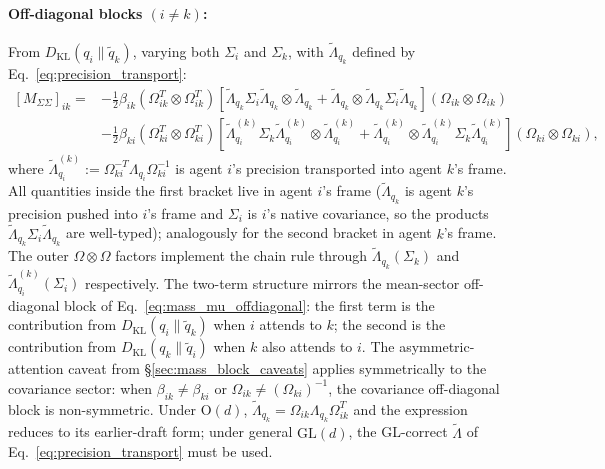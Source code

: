 \documentclass[11pt]{article}
\begin{document}
\paragraph{Off-diagonal blocks $(i \neq k)$:} From $D_{\mathrm{KL}}(q_i \| \tilde{q}_k)$, varying both $\Sigma_i$ and $\Sigma_k$, with $\tilde{\Lambda}_{q_k}$ defined by Eq.~\eqref{eq:precision_transport}:
\begin{equation}
\boxed{\begin{aligned}
[M_{\Sigma\Sigma}]_{ik} = &-\frac{1}{2}\beta_{ik}(\Omega_{ik}^T \otimes \Omega_{ik}^T)\left[\tilde{\Lambda}_{q_k}\Sigma_i\tilde{\Lambda}_{q_k} \otimes \tilde{\Lambda}_{q_k} + \tilde{\Lambda}_{q_k} \otimes \tilde{\Lambda}_{q_k}\Sigma_i\tilde{\Lambda}_{q_k}\right](\Omega_{ik} \otimes \Omega_{ik}) \\
&-\frac{1}{2}\beta_{ki}(\Omega_{ki}^T \otimes \Omega_{ki}^T)\left[\tilde{\Lambda}_{q_i}^{(k)}\Sigma_k\tilde{\Lambda}_{q_i}^{(k)} \otimes \tilde{\Lambda}_{q_i}^{(k)} + \tilde{\Lambda}_{q_i}^{(k)} \otimes \tilde{\Lambda}_{q_i}^{(k)}\Sigma_k\tilde{\Lambda}_{q_i}^{(k)}\right](\Omega_{ki} \otimes \Omega_{ki}),
\end{aligned}}
\label{eq:mass_sigma_offdiagonal}
\end{equation}
where $\tilde{\Lambda}_{q_i}^{(k)} := \Omega_{ki}^{-T}\Lambda_{q_i}\Omega_{ki}^{-1}$ is agent $i$'s precision transported into agent $k$'s frame. All quantities inside the first bracket live in agent $i$'s frame ($\tilde{\Lambda}_{q_k}$ is agent $k$'s precision pushed into $i$'s frame and $\Sigma_i$ is $i$'s native covariance, so the products $\tilde{\Lambda}_{q_k}\Sigma_i\tilde{\Lambda}_{q_k}$ are well-typed); analogously for the second bracket in agent $k$'s frame. The outer $\Omega \otimes \Omega$ factors implement the chain rule through $\tilde{\Lambda}_{q_k}(\Sigma_k)$ and $\tilde{\Lambda}_{q_i}^{(k)}(\Sigma_i)$ respectively. The two-term structure mirrors the mean-sector off-diagonal block of Eq.~\eqref{eq:mass_mu_offdiagonal}: the first term is the contribution from $D_{\mathrm{KL}}(q_i \| \tilde{q}_k)$ when $i$ attends to $k$; the second is the contribution from $D_{\mathrm{KL}}(q_k \| \tilde{q}_i)$ when $k$ also attends to $i$. The asymmetric-attention caveat from \S\ref{sec:mass_block_caveats} applies symmetrically to the covariance sector: when $\beta_{ik} \neq \beta_{ki}$ or $\Omega_{ik} \neq (\Omega_{ki})^{-1}$, the covariance off-diagonal block is non-symmetric. Under $\mathrm{O}(d)$, $\tilde{\Lambda}_{q_k} = \Omega_{ik}\Lambda_{q_k}\Omega_{ik}^T$ and the expression reduces to its earlier-draft form; under general $\mathrm{GL}(d)$, the GL-correct $\tilde{\Lambda}$ of Eq.~\eqref{eq:precision_transport} must be used.
\end{document}
